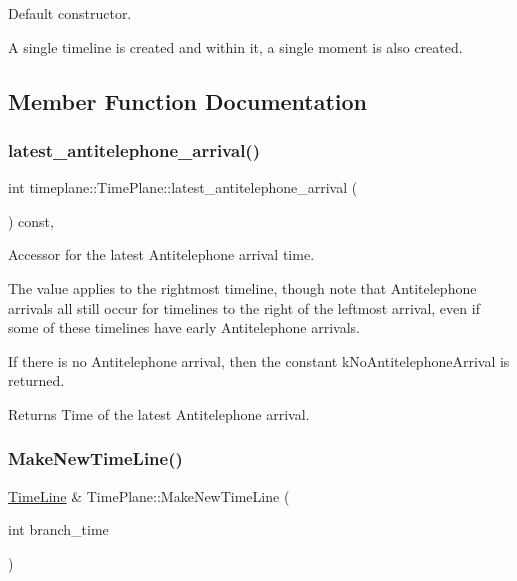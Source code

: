 Default constructor. 

A single timeline is created and within it, a single moment is also created. 

\subsection{Member Function Documentation}
\mbox{\label{classtimeplane_1_1_time_plane_ae66d15a7ce9adb5f63906011a455400b}} 
\subsubsection{\texorpdfstring{latest\+\_\+antitelephone\+\_\+arrival()}{latest\_antitelephone\_arrival()}}
{\footnotesize\ttfamily int timeplane\+::\+Time\+Plane\+::latest\+\_\+antitelephone\+\_\+arrival (\begin{DoxyParamCaption}{ }\end{DoxyParamCaption}) const\hspace{0.3cm}{\ttfamily [inline]}, {\ttfamily [noexcept]}}



Accessor for the latest Antitelephone arrival time. 

The value applies to the rightmost timeline, though note that Antitelephone arrivals all still occur for timelines to the right of the leftmost arrival, even if some of these timelines have early Antitelephone arrivals.

If there is no Antitelephone arrival, then the constant {\ttfamily k\+No\+Antitelephone\+Arrival} is returned. \begin{DoxyReturn}{Returns}
Time of the latest Antitelephone arrival. 
\end{DoxyReturn}
\mbox{\label{classtimeplane_1_1_time_plane_ab8c82092c1c5c3f18c8677f8ce38662c}} 
\subsubsection{\texorpdfstring{Make\+New\+Time\+Line()}{MakeNewTimeLine()}}
{\footnotesize\ttfamily \hyperlink{classtimeplane_1_1_time_line}{Time\+Line} \& Time\+Plane\+::\+Make\+New\+Time\+Line (\begin{DoxyParamCaption}\item[{int}]{branch\+\_\+time }\end{DoxyParamCaption})}




